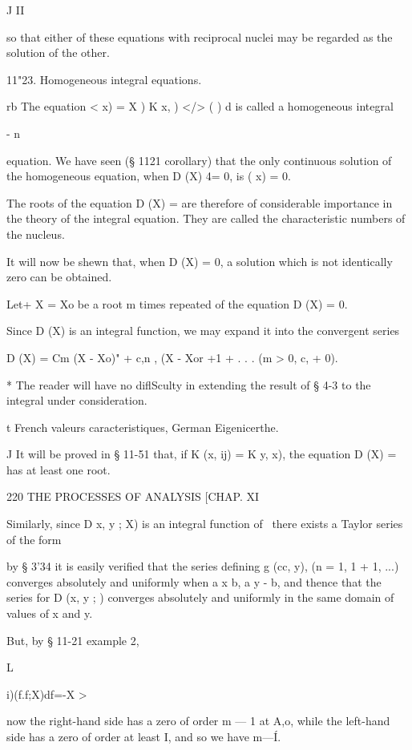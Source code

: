 J II

so that either of these equations with reciprocal nuclei may be
regarded as the solution of the other.

11"23. Homogeneous integral equations.

rb The equation < x) = X ) K x, ) </> ( ) d is called a homogeneous
integral

- n

equation. We have seen (§ 1121 corollary) that the only continuous
solution of the homogeneous equation, when D (X) 4= 0, is ( x) = 0.

The roots of the equation D (X) = are therefore of considerable
importance in the theory of the integral equation. They are called the
characteristic numbers of the nucleus.

It will now be shewn that, when D (X) = 0, a solution which is not
identically zero can be obtained.

Let+ X = Xo be a root m times repeated of the equation D (X) = 0.

Since D (X) is an integral function, we may expand it into the
convergent series

D (X) = Cm (X - Xo)" + c,n , (X - Xor +1 + . . . (m > 0, c, + 0).

* The reader will have no diflSculty in extending the result of § 4-3
to the integral under consideration.

t French valeurs caracteristiques, German Eigenicerthe.

J It will be proved in § 11-51 that, if K (x, ij) = K y, x), the
equation D (X) = has at least one root.



220 THE PROCESSES OF ANALYSIS [CHAP. XI

Similarly, since D x, y ; X) is an integral function of \, there
exists a Taylor series of the form

by § 3'34 it is easily verified that the series defining g (cc, y), (n
= 1, 1 + 1, ...) converges absolutely and uniformly when a x b, a y -
b, and thence that the series for D (x, y ; ) converges absolutely and
uniformly in the same domain of values of x and y.

But, by § 11-21 example 2,



L



i)(f.f;X)df=-X >



now the right-hand side has a zero of order m — 1 at A,o, while the
left-hand side has a zero of order at least I, and so we have m—\' I.

